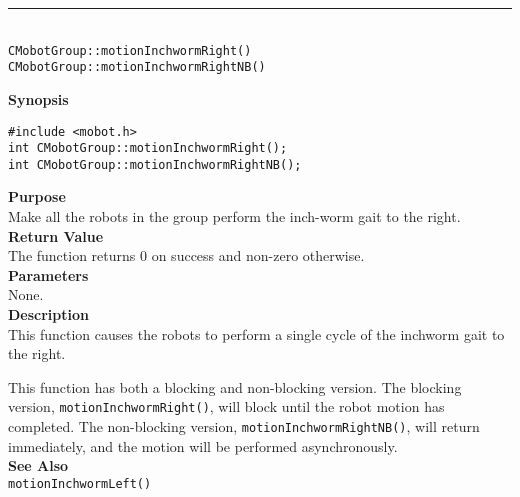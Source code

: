 \noindent
\vspace{5pt}
\rule{4.5in}{0.015in}\\
\noindent
{\LARGE \texttt{CMobotGroup::motionInchwormRight()}}\\
{\LARGE \texttt{CMobotGroup::motionInchwormRightNB()}}\\
{}

\noindent
{\bf Synopsis}
\begin{verbatim}
#include <mobot.h>
int CMobotGroup::motionInchwormRight();
int CMobotGroup::motionInchwormRightNB();
\end{verbatim}

\noindent
{\bf Purpose}\\
Make all the robots in the group perform the inch-worm gait to the right.\\

\noindent
{\bf Return Value}\\
The function returns 0 on success and non-zero otherwise.\\

\noindent
{\bf Parameters}\\
None.\\

\noindent
{\bf Description}\\
This function causes the robots to perform a single cycle of the inchworm gait
to the right. 

This function has both a blocking and non-blocking version.
The blocking version, \texttt{motionInchwormRight()}, will block until the
robot motion has completed. The non-blocking version, \texttt{motionInchwormRightNB()},
will return immediately, and the motion will be performed asynchronously.\\

\noindent
{\bf See Also}\\
\texttt{motionInchwormLeft()}

